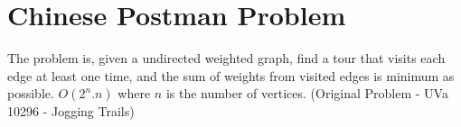 
    \section{Chinese Postman Problem}
    The problem is, given a undirected weighted graph, find a tour that visits each edge at least one time, and the sum of weights from visited edges is minimum as possible.
    $O(2^n.n)$ where $n$ is the number of vertices. (Original Problem - UVa 10296 - Jogging Trails)
    
